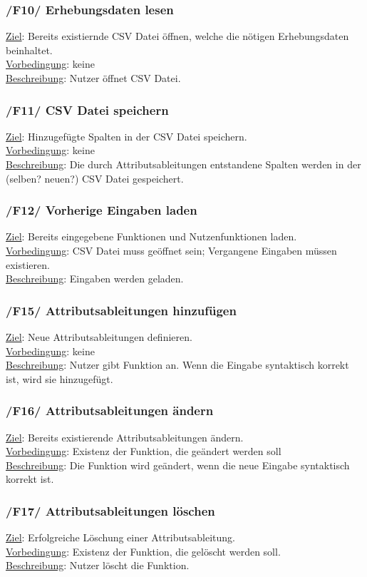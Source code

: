 \documentclass{article}
\begin{document}
\subsubsection*{/F10/ Erhebungsdaten lesen}
\underline {Ziel}:   Bereits existiernde CSV Datei öffnen, welche die nötigen Erhebungsdaten beinhaltet. \\
\underline{Vorbedingung}: keine\\
\underline{Beschreibung}: Nutzer öffnet CSV Datei.
\subsubsection*{/F11/ CSV Datei speichern}
\underline{Ziel}: Hinzugefügte Spalten in der CSV Datei speichern. \\
\underline{Vorbedingung}: keine \\
\underline{Beschreibung}: Die durch Attributsableitungen entstandene Spalten werden in der (selben? neuen?) CSV Datei gespeichert.
\subsubsection*{/F12/ Vorherige Eingaben laden}
\underline{Ziel}: Bereits eingegebene Funktionen und Nutzenfunktionen laden. \\
\underline{Vorbedingung}: CSV Datei muss geöffnet sein; Vergangene Eingaben müssen existieren. \\
\underline{Beschreibung}: Eingaben werden geladen.
\subsubsection*{/F15/ Attributsableitungen hinzufügen}
\underline{Ziel}: Neue Attributsableitungen definieren. \\
\underline{Vorbedingung}: keine \\
\underline{Beschreibung}: Nutzer gibt Funktion an. Wenn die Eingabe syntaktisch korrekt ist, wird sie hinzugefügt.
\subsubsection*{/F16/ Attributsableitungen ändern}
\underline{Ziel}: Bereits existierende Attributsableitungen ändern. \\
\underline{Vorbedingung}: Existenz der Funktion, die geändert werden soll  \\
\underline{Beschreibung}: Die Funktion wird geändert, wenn die neue Eingabe syntaktisch korrekt ist.
\subsubsection*{/F17/ Attributsableitungen löschen}
\underline{Ziel}: Erfolgreiche Löschung einer Attributsableitung. \\
\underline{Vorbedingung}: Existenz der Funktion, die gelöscht werden soll.\\
\underline{Beschreibung}: Nutzer löscht die Funktion.
\end{document}
